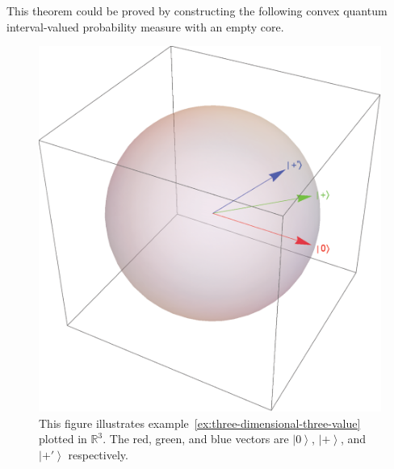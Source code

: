 \documentclass[12pt]{iopart}
\theoremstyle{plain}
\theoremstyle{definition}
\newcommand{\ket}[1]{{\left\vert{#1}\right\rangle}}
\newcommand{\ps}{\texttt{+}}
\begin{document}
This theorem could be proved by constructing the following convex
quantum interval-valued probability measure with an empty core.
\begin{figure}
\begin{centering}
\includegraphics[scale=0.38]{figure2_1} 
\par\end{centering}
\caption{\label{fig:three-dimensional-3-value-2}This figure illustrates example~\ref{ex:three-dimensional-three-value}
plotted in $\mathbb{R}^{3}$. The red, green, and blue vectors are
$\ket{0}$, $\ket{\ps}$, and $\ket{\ps'}$ respectively. }
\end{figure}
\end{document}
